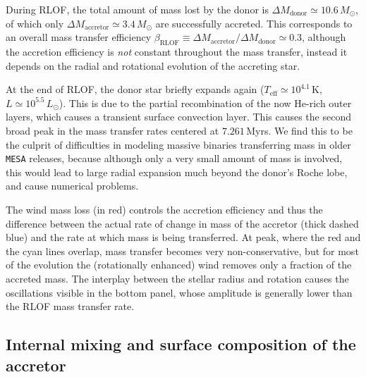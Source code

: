 \documentclass[twocolumn,twocolappendix,trackchanges]{aastex63}
\begin{document}
During RLOF, the total amount of mass lost by the donor is
$\Delta M_\mathrm{donor} \simeq 10.6\,M_\odot$, of which only
$\Delta M_\mathrm{accretor}\simeq 3.4\,M_\odot$ are successfully
accreted. This corresponds to an overall mass
transfer efficiency
$\beta_\mathrm{RLOF}\equiv \Delta M_\mathrm{accretor}/\Delta M_\mathrm{donor} \simeq 0.3$,
although the accretion efficiency is \emph{not} constant throughout the
mass transfer, instead it depends on the radial and rotational evolution of
the accreting star.

At the end of RLOF, the donor star briefly expands again
($T_\mathrm{eff}\simeq10^{4.1}$\,K, $L\simeq10^{5.5}\,L_\odot$). This
is due to the partial recombination of the now He-rich outer layers,
which causes a transient surface convection layer. This causes the
second broad peak in the mass transfer rates centered at $7.261$\,Myrs. We
find this to be the culprit of difficulties in modeling massive
binaries transferring mass in older \texttt{MESA} releases, because
although only a very small amount of mass is involved, this would lead
to large radial expansion much beyond the donor's Roche lobe, and
cause numerical problems.

The wind mass loss (in red) controls the accretion efficiency and thus
the difference between the actual rate of change in mass of the
accretor (thick dashed blue) and the rate at which mass is being
transferred. At peak, where the red and the cyan lines overlap, mass
transfer becomes very non-conservative, but for most of the evolution
the (rotationally enhanced) wind removes only a fraction of the
accreted mass. The interplay between the stellar radius and rotation
causes the oscillations visible in the bottom panel, whose amplitude
is generally lower than the RLOF mass transfer rate.

\subsection{Internal mixing and surface composition of the accretor}
\label{sec:mixing}
\end{document}
